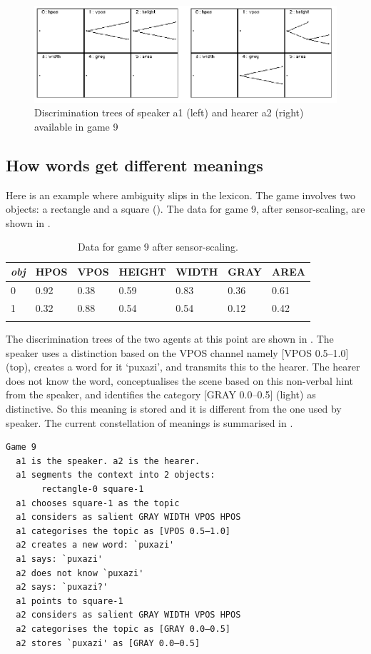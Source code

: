 \begin{figure}[htbp]
  \centerline{\includegraphics[width=\textwidth]{chap6/figs/discri-game9.pdf}}
\caption{\label{discri-game9}Discrimination trees
of speaker a1 (left) and hearer a2 (right) available 
in game 9}
\end{figure}

\subsection{How words get different meanings}

Here is an example where ambiguity slips in 
the lexicon. The game involves two 
objects: a rectangle and a square (). 
The data for game 9, after sensor-scaling, are
shown in .  


\begin{table}
\begin{center}
\begin{tabular}{ l  l  l  l  l  l  l }
\lsptoprule
{\itshape obj} & HPOS & VPOS & HEIGHT & WIDTH & GRAY & AREA \\ \midrule
0 & 0.92 & 0.38 & 0.59 & 0.83 & 0.36 & 0.61\\ 
1 & 0.32 & 0.88 & 0.54 & 0.54 & 0.12 & 0.42\\ 
\lspbottomrule
\end{tabular}
\caption{\label{tab:different}Data for game 9 after sensor-scaling.}
\end{center}
\end{table}
The discrimination trees of the two agents at this point
are shown in . 
The speaker uses a distinction based on the 
VPOS channel namely [VPOS 0.5–1.0] (top), creates
a word for it `puxazi', and transmits this to the hearer. 
The hearer does not know the word,
conceptualises the scene based on this non-verbal
hint from the speaker, and identifies the category
{}[GRAY 0.0–0.5] (light) as distinctive. So this 
meaning is stored and it is different from the one used by 
speaker. The current constellation of meanings
is summarised in . 
\begin{verbatim}
Game 9
  a1 is the speaker. a2 is the hearer. 
  a1 segments the context into 2 objects: 
       rectangle-0 square-1 
  a1 chooses square-1 as the topic 
  a1 considers as salient GRAY WIDTH VPOS HPOS 
  a1 categorises the topic as [VPOS 0.5–1.0]
  a2 creates a new word: `puxazi'
  a1 says: `puxazi'
  a2 does not know `puxazi'
  a2 says: `puxazi?'
  a1 points to square-1
  a2 considers as salient GRAY WIDTH VPOS HPOS 
  a2 categorises the topic as [GRAY 0.0–0.5]
  a2 stores `puxazi' as [GRAY 0.0–0.5]
\end{verbatim}



